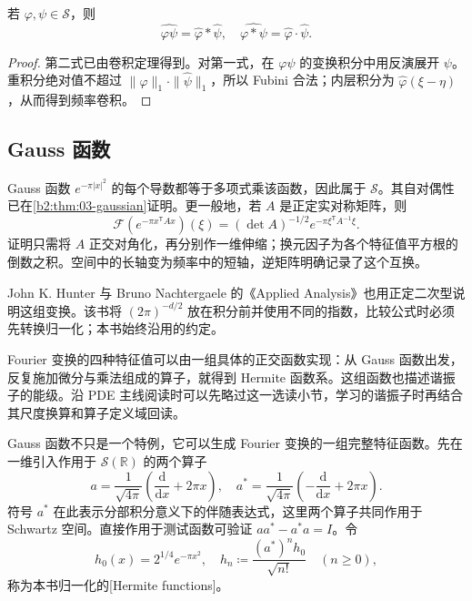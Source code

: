 \begin{proposition}\label{b2:prop:05-product-transform}
若 \(\varphi,\psi\in\mathcal S\)，则
\[
 \widehat{\varphi\psi}=\widehat\varphi*\widehat\psi,
 \quad \widehat{\varphi*\psi}=\widehat\varphi\cdot\widehat\psi.
\]
\end{proposition}
\begin{proof}
第二式已由卷积定理得到。对第一式，在 \(\varphi\psi\) 的变换积分中用反演展开 \(\psi\)。重积分绝对值不超过 \(\|\varphi\|_1\cdot\|\widehat\psi\|_1\)，所以 Fubini 合法；内层积分为 \(\widehat\varphi(\xi-\eta)\)，从而得到频率卷积。
\end{proof}

\subsection{Gauss 函数}
\label{b2:subsec:050203}

Gauss 函数 \(e^{-\pi|x|^2}\) 的每个导数都等于多项式乘该函数，因此属于 \(\mathcal S\)。其自对偶性已在\cref{b2:thm:03-gaussian}证明。更一般地，若 \(A\) 是正定实对称矩阵，则
\[
 \mathcal F(e^{-\pi x^{\mathsf T}Ax})(\xi)
 =(\det A)^{-1/2}e^{-\pi\xi^{\mathsf T}A^{-1}\xi}.
\]
证明只需将 \(A\) 正交对角化，再分别作一维伸缩；换元因子为各个特征值平方根的倒数之积。空间中的长轴变为频率中的短轴，逆矩阵明确记录了这个互换。

\ProseParagraphBreak

John K. Hunter 与 Bruno Nachtergaele 的《Applied Analysis》\cite[pp. 303--304]{Hunter2001Applied}也用正定二次型说明这组变换。该书将 \((2\pi)^{-d/2}\) 放在积分前并使用不同的指数，比较公式时必须先转换归一化；本书始终沿用的约定。


Fourier 变换的四种特征值可以由一组具体的正交函数实现：从 Gauss 函数出发，反复施加微分与乘法组成的算子，就得到 Hermite 函数系。这组函数也描述谐振子的能级。沿 PDE 主线阅读时可以先略过这一选读小节，学习的谐振子时再结合其尺度换算和算子定义域回读。

Gauss 函数不只是一个特例，它可以生成 Fourier 变换的一组完整特征函数。先在一维引入作用于 \(\mathcal S(\mathbb R)\) 的两个算子
\[
 a=\dfrac1{\sqrt{4\pi}}\left(\dfrac{\mathrm{d}}{\mathrm{d}x}+2\pi x\right),
 \quad
 a^*=\dfrac1{\sqrt{4\pi}}\left(-\dfrac{\mathrm{d}}{\mathrm{d}x}+2\pi x\right).
\]
符号 \(a^*\) 在此表示分部积分意义下的伴随表达式，这里两个算子共同作用于 Schwartz 空间。直接作用于测试函数可验证 \(aa^*-a^*a=I\)。令
\[
 h_0(x)=2^{1/4}e^{-\pi x^2},\quad
 h_n\coloneqq\dfrac{(a^*)^nh_0}{\sqrt{n!}}\quad(n\geq0),
\]
称为本书归一化的[Hermite functions]。

